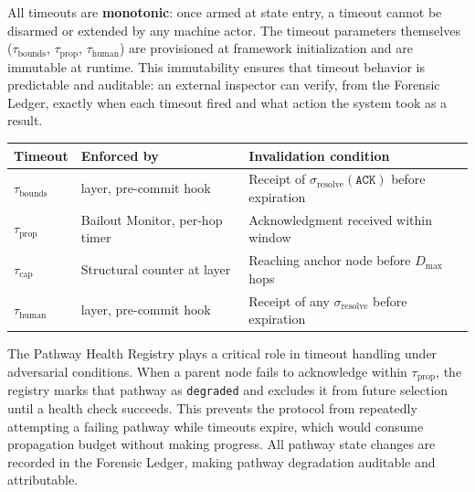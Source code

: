 All timeouts are \textbf{monotonic}: once armed at state entry, a timeout cannot be disarmed or extended by any machine actor. The timeout parameters themselves ($\tau_{\text{bounds}}$, $\tau_{\text{prop}}$, $\tau_{\text{human}}$) are provisioned at framework initialization and are immutable at runtime. This immutability ensures that timeout behavior is predictable and auditable: an external inspector can verify, from the Forensic Ledger, exactly when each timeout fired and what action the system took as a result.

\medskip
\noindent\begin{minipage}{\linewidth}
\label{tab:bp-timeout-enforcement}
\medskip
\noindent\begin{tabular}{lp{3cm}p{5cm}}
\toprule
\textbf{Timeout} & \textbf{Enforced by} & \textbf{Invalidation condition} \\
\midrule
$\tau_{\text{bounds}}$  & \fact{} layer, pre-commit hook & Receipt of $\sigma_{\text{resolve}}(\texttt{ACK})$ before expiration \\
$\tau_{\text{prop}}$   & Bailout Monitor, per-hop timer & Acknowledgment received within window \\
$\tau_{\text{cap}}$    & Structural counter at \fact{} layer & Reaching anchor node before $D_{\max}$ hops \\
$\tau_{\text{human}}$  & \fact{} layer, pre-commit hook & Receipt of any $\sigma_{\text{resolve}}$ before expiration \\
\bottomrule
\end{tabular}
\end{minipage}

The Pathway Health Registry plays a critical role in timeout handling under adversarial conditions. When a parent node fails to acknowledge within $\tau_{\text{prop}}$, the registry marks that pathway as \texttt{degraded} and excludes it from future selection until a health check succeeds. This prevents the protocol from repeatedly attempting a failing pathway while timeouts expire, which would consume propagation budget without making progress. All pathway state changes are recorded in the Forensic Ledger, making pathway degradation auditable and attributable.